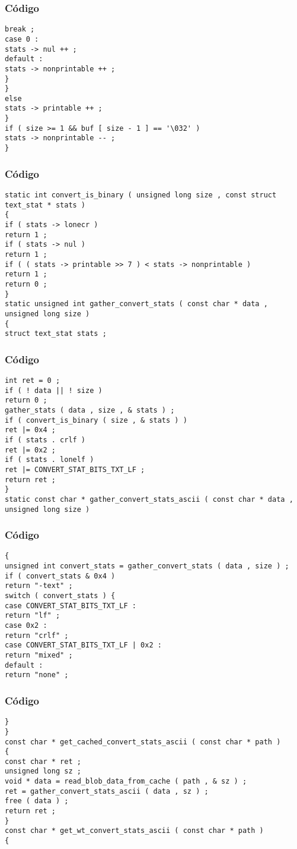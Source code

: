 \documentclass{beamer}
\begin{document}
\begin{frame}[fragile]
\frametitle{C\'odigo}
\begin{verbatim}
break ; 
case 0 : 
stats -> nul ++ ; 
default : 
stats -> nonprintable ++ ; 
} 
} 
else 
stats -> printable ++ ; 
} 
if ( size >= 1 && buf [ size - 1 ] == '\032' ) 
stats -> nonprintable -- ; 
} 
\end{verbatim}
\end{frame}
\begin{frame}[fragile]
\frametitle{C\'odigo}
\begin{verbatim}
static int convert_is_binary ( unsigned long size , const struct text_stat * stats ) 
{ 
if ( stats -> lonecr ) 
return 1 ; 
if ( stats -> nul ) 
return 1 ; 
if ( ( stats -> printable >> 7 ) < stats -> nonprintable ) 
return 1 ; 
return 0 ; 
} 
static unsigned int gather_convert_stats ( const char * data , unsigned long size ) 
{ 
struct text_stat stats ; 
\end{verbatim}
\end{frame}
\begin{frame}[fragile]
\frametitle{C\'odigo}
\begin{verbatim}
int ret = 0 ; 
if ( ! data || ! size ) 
return 0 ; 
gather_stats ( data , size , & stats ) ; 
if ( convert_is_binary ( size , & stats ) ) 
ret |= 0x4 ; 
if ( stats . crlf ) 
ret |= 0x2 ; 
if ( stats . lonelf ) 
ret |= CONVERT_STAT_BITS_TXT_LF ; 
return ret ; 
} 
static const char * gather_convert_stats_ascii ( const char * data , unsigned long size ) 
\end{verbatim}
\end{frame}
\begin{frame}[fragile]
\frametitle{C\'odigo}
\begin{verbatim}
{ 
unsigned int convert_stats = gather_convert_stats ( data , size ) ; 
if ( convert_stats & 0x4 ) 
return "-text" ; 
switch ( convert_stats ) { 
case CONVERT_STAT_BITS_TXT_LF : 
return "lf" ; 
case 0x2 : 
return "crlf" ; 
case CONVERT_STAT_BITS_TXT_LF | 0x2 : 
return "mixed" ; 
default : 
return "none" ; 
\end{verbatim}
\end{frame}
\begin{frame}[fragile]
\frametitle{C\'odigo}
\begin{verbatim}
} 
} 
const char * get_cached_convert_stats_ascii ( const char * path ) 
{ 
const char * ret ; 
unsigned long sz ; 
void * data = read_blob_data_from_cache ( path , & sz ) ; 
ret = gather_convert_stats_ascii ( data , sz ) ; 
free ( data ) ; 
return ret ; 
} 
const char * get_wt_convert_stats_ascii ( const char * path ) 
{ 
\end{verbatim}
\end{frame}
\end{document}
